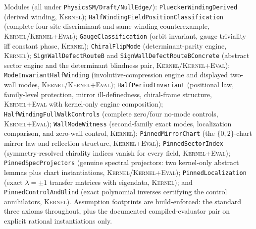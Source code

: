 \documentclass[11pt]{article}
\newcommand{\Kernel}{\textcolor{kernelcolor}{\textsc{Kernel}}}
\newcommand{\DraftTrust}{\textcolor{draftcolor}{\textsc{Kernel+Eval}}}
\begin{document}
Modules (all under \texttt{PhysicsSM/Draft/NullEdge/}):
\texttt{PlueckerWindingDerived} (derived winding, \Kernel{});
\texttt{HalfWindingFieldPositionClassification} (complete four-site
discriminant and same-winding counterexample, \Kernel{}/\DraftTrust{});
\texttt{GaugeClassification} (orbit invariant, gauge triviality iff
constant phase, \Kernel{}); \texttt{ChiralFlipMode} (determinant-parity
engine, \Kernel{}); \texttt{SignWallDefectRouteB} and
\texttt{SignWallDefectRouteBConcrete} (abstract sector engine and the
determinant blindness pair, \Kernel{}/\DraftTrust{});
\texttt{ModeInvariantHalfWinding} (involutive-compression engine and displayed
two-wall modes, \Kernel{}/\DraftTrust{});
\texttt{HalfPeriodInvariant} (positional law, family-level protection,
mirror ill-definedness, chiral-frame structure, \DraftTrust{} with
kernel-only engine composition);
\texttt{HalfWindingFullWalkControls} (complete zero/four no-mode controls,
\DraftTrust{}); \texttt{WallModeWitness} (second-family exact modes,
localization comparison, and zero-wall control, \Kernel{});
\texttt{PinnedMirrorChart} (the $\{0,2\}$-chart mirror law and
reflection structure, \DraftTrust{}); \texttt{PinnedSectorIndex}
(symmetry-resolved chirality indices vanish for every field,
\DraftTrust{}); \texttt{PinnedSpecProjectors} (genuine spectral
projectors: two kernel-only abstract lemmas plus chart instantiations,
\Kernel{}/\DraftTrust{}); \texttt{PinnedLocalization} (exact
$\lambda=\pm1$ transfer matrices with eigendata, \Kernel{}); and
\texttt{PinnedControlAndBlind} (exact polynomial inverses certifying the
control annihilators, \Kernel{}).
Assumption footprints are build-enforced: the standard three axioms
throughout, plus the documented compiled-evaluator pair on explicit
rational instantiations only.
\end{document}
